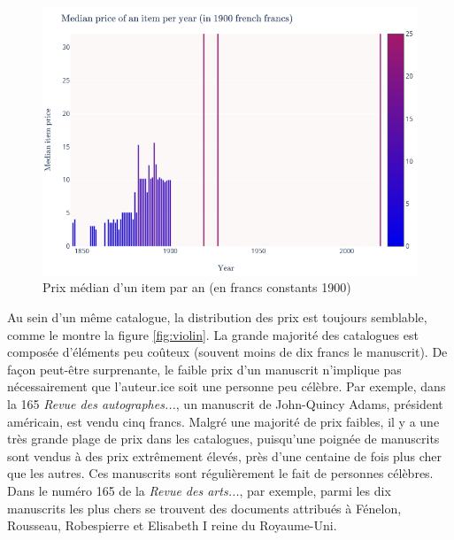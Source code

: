 \begin{figure}[!h]
	\includegraphics[width=\textwidth]{annexes/fig_med_itm.png}
	\caption{Prix médian d'un item par an (en francs constants 1900)}
	\label{fig:meditm}
\end{figure}

Au sein d'un même catalogue, la distribution des prix est toujours semblable, comme le montre la figure \ref{fig:violin}. La grande majorité des catalogues est composée d'éléments peu coûteux (souvent moins de dix francs le manuscrit). De façon peut-être surprenante, le faible prix d'un manuscrit n'implique pas nécessairement que l'auteur.ice soit une personne peu célèbre. Par exemple, dans la 165 \textit{Revue des autographes...}, un manuscrit de John-Quincy Adams, président américain, est vendu cinq francs. Malgré une majorité de prix faibles, il y a une très grande plage de prix dans les catalogues, puisqu'une poignée de manuscrits sont vendus à des prix extrêmement élevés, près d'une centaine de fois plus cher que les autres. Ces manuscrits sont régulièrement le fait de personnes célèbres. Dans le numéro 165 de la \textit{Revue des arts...}, par exemple, parmi les dix manuscrits les plus chers se trouvent des documents attribués à Fénelon, Rousseau, Robespierre et Elisabeth I reine du Royaume-Uni.

